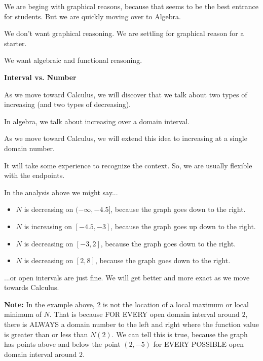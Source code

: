 \documentclass{ximera}
\begin{document}
We are beging with graphical reasons, because that seems to be the best entrance for students.  But we are quickly moving over to Algebra.  

We don't want graphical reasoning. We are settling for graphical reason for a starter.

We want algebraic and functional reasoning.







\begin{observation} \textbf{\textcolor{-red!75}{Interval vs. Number}}

As we move toward Calculus, we will discover that we talk about two types of increasing (and two types of decreasing). 

In algebra, we talk about increasing over a domain interval. 

As we move toward Calculus, we will extend this idea to increasing at a single domain number. 


It will take some experience to recognize the context.  So, we are usually flexible with the endpoints. 

In the analysis above we might say...


\begin{itemize}
     \item $N$ is decreasing on $(-\infty, -4.5]$, because the graph goes down to the right.
     \item $N$ is increasing on $[-4.5, -3]$, because the graph goes up down to the right.
     \item $N$ is decreasing on $[-3, 2]$, because the graph goes down to the right.
     \item $N$ is decreasing on $[2, 8]$, because the graph goes down to the right.
\end{itemize}


...or open intervals are just fine.  We will get better and more exact as we move towards Calculus.



\end{observation}




\textbf{Note:} In the example above, $2$ is not the location of a local maximum or local minimum of $N$.  That is because FOR EVERY open domain interval around $2$, there is ALWAYS a domain number to the left and right where the function value is greater than or less than $N(2)$.  We can tell this is true, because the graph has points above and below the point $(2, -5)$ for EVERY POSSIBLE open domain interval around $2$. 
\end{document}
